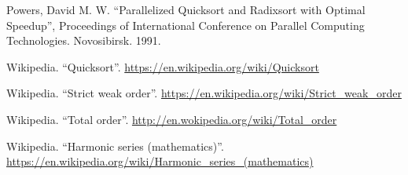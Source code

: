 \documentclass[b5paper]{ctexart}
\begin{document}
\begin{thebibliography}{99}
Powers, David M. W. ``Parallelized Quicksort and Radixsort with Optimal Speedup'', Proceedings of International Conference on Parallel Computing Technologies. Novosibirsk. 1991.

Wikipedia. ``Quicksort''. \url{https://en.wikipedia.org/wiki/Quicksort}

Wikipedia. ``Strict weak order''. \url{https://en.wikipedia.org/wiki/Strict_weak_order}

Wikipedia. ``Total order''. \url{http://en.wokipedia.org/wiki/Total_order}

Wikipedia. ``Harmonic series (mathematics)''. \url{https://en.wikipedia.org/wiki/Harmonic_series_(mathematics)}

\end{thebibliography}

\expandafter\enddocument
\fi
\end{document}
